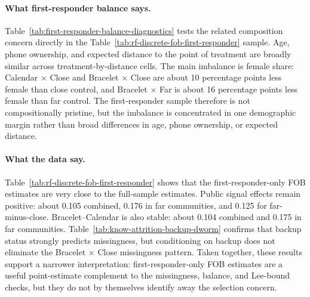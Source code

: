 \documentclass[11pt]{article}
\begin{document}
\paragraph{What first-responder balance says.}
Table~\ref{tab:first-responder-balance-diagnostics} tests the related composition concern directly in the Table~\ref{tab:rf-discrete-fob-first-responder} sample. Age, phone ownership, and expected distance to the point of treatment are broadly similar across treatment-by-distance cells. The main imbalance is female share: Calendar $\times$ Close and Bracelet $\times$ Close are about 10 percentage points less female than close control, and Bracelet $\times$ Far is about 16 percentage points less female than far control. The first-responder sample therefore is not compositionally pristine, but the imbalance is concentrated in one demographic margin rather than broad differences in age, phone ownership, or expected distance.

\begin{table}[!htbp]
\centering
\caption{Reduced-form FOB effects among first responders only}
\label{tab:rf-discrete-fob-first-responder}

\end{table}

\begin{table}[!htbp]
\centering
\caption{Knowledge-table missingness and backup-respondent status}
\label{tab:know-attrition-backup-dworm}

\end{table}
\FloatBarrier

\paragraph{What the data say.}
Table~\ref{tab:rf-discrete-fob-first-responder} shows that the first-responder-only FOB estimates are very close to the full-sample estimates. Public signal effects remain positive: about 0.105 combined, 0.176 in far communities, and 0.125 for far-minus-close. Bracelet--Calendar is also stable: about 0.104 combined and 0.175 in far communities. Table~\ref{tab:know-attrition-backup-dworm} confirms that backup status strongly predicts missingness, but conditioning on backup does not eliminate the Bracelet $\times$ Close missingness pattern. Taken together, these results support a narrower interpretation: first-responder-only FOB estimates are a useful point-estimate complement to the missingness, balance, and Lee-bound checks, but they do not by themselves identify away the selection concern.
\end{document}
